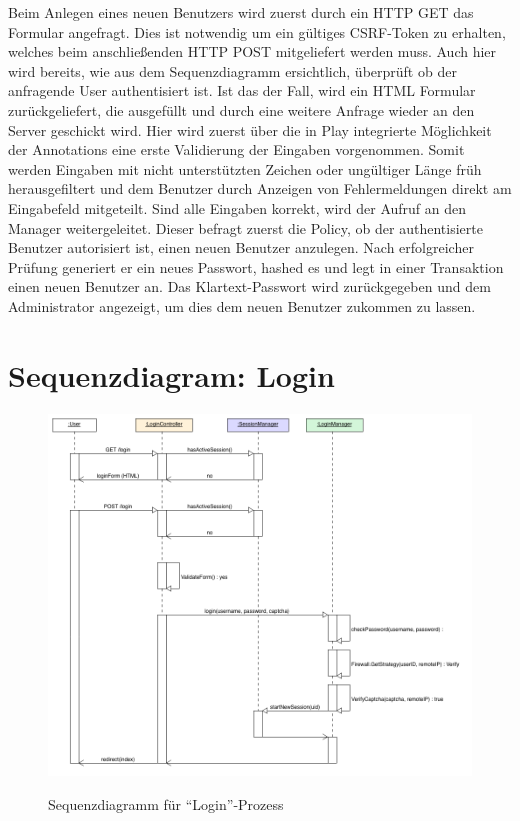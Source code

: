 \documentclass[12pt,DIV14,BCOR10mm,a4paper,parskip=half-,headsepline,headinclude,english,ngerman,bibliography=totocnumbered]{scrreprt}
\begin{document}
Beim Anlegen eines neuen Benutzers wird zuerst durch ein HTTP GET das Formular angefragt.
Dies ist notwendig um ein gültiges CSRF-Token zu erhalten, welches beim anschließenden HTTP POST mitgeliefert werden muss. Auch hier wird bereits, wie aus dem Sequenzdiagramm ersichtlich, überprüft ob der anfragende User authentisiert ist.
Ist das der Fall, wird ein HTML Formular zurückgeliefert, die ausgefüllt und durch eine weitere Anfrage wieder an den Server geschickt wird.
Hier wird zuerst über die in Play integrierte Möglichkeit der Annotations eine erste Validierung der Eingaben vorgenommen.
Somit werden Eingaben mit nicht unterstützten Zeichen oder ungültiger Länge früh herausgefiltert und dem Benutzer durch Anzeigen von Fehlermeldungen direkt am Eingabefeld mitgeteilt.
Sind alle Eingaben korrekt, wird der Aufruf an den Manager weitergeleitet.
Dieser befragt zuerst die Policy, ob der authentisierte Benutzer autorisiert ist, einen neuen Benutzer anzulegen.
Nach erfolgreicher Prüfung generiert er ein neues Passwort, hashed es und legt in einer Transaktion einen neuen Benutzer an.
Das Klartext-Passwort wird zurückgegeben und dem Administrator angezeigt, um dies dem neuen Benutzer zukommen zu lassen.

\section{Sequenzdiagram: Login}

\begin{figure}[!htb]
\hspace*{-1cm}
\includegraphics[width=0.83\paperwidth]{resources/loginseq_diagram.png}
\label{architecture:loginseq_diagram}
\caption{Sequenzdiagramm für \enquote{Login}-Prozess}
\end{figure}
\end{document}
